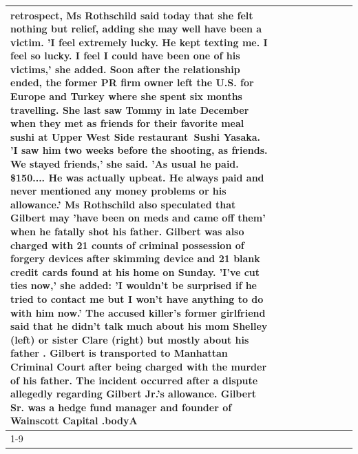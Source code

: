 \begin{table}[H]
\begin{tabular}{lllrlllll}
retrospect, Ms Rothschild said today that she felt nothing but relief, adding she may well have been a victim. 'I feel extremely lucky. He kept texting me. I feel so lucky. I feel I could have been one of his victims,' she added. Soon after the relationship ended, the former PR firm owner left the U.S. for Europe and Turkey where she spent six months  travelling. She last saw Tommy in late December when they met as friends for their favorite meal sushi at Upper West Side restaurant Sushi Yasaka. 'I saw him two weeks before the shooting, as friends. We stayed friends,' she said. 'As usual he paid. \$150.... He was actually upbeat. He always paid and never mentioned any money problems or his allowance.' Ms Rothschild also speculated that Gilbert may 'have been on meds and came off them' when he fatally shot his father. Gilbert was also charged with 21 counts of criminal possession of forgery devices after skimming device and 21 blank credit cards found at his home on Sunday. 'I've cut ties now,' she added: 'I wouldn’t be surprised if he tried to contact me but I won’t have anything to do with him now.' The accused killer's former girlfriend said that he didn't talk much about his mom Shelley (left) or sister Clare (right) but mostly about his father . Gilbert is transported to Manhattan Criminal Court  after being charged with the murder of his father. The incident occurred after a dispute allegedly regarding Gilbert Jr.'s allowance. Gilbert Sr. was a hedge fund manager and founder of Wainscott Capital .bodyA \\
\cline{1-9} \cline{2-9}

\end{tabular}
\end{table}
